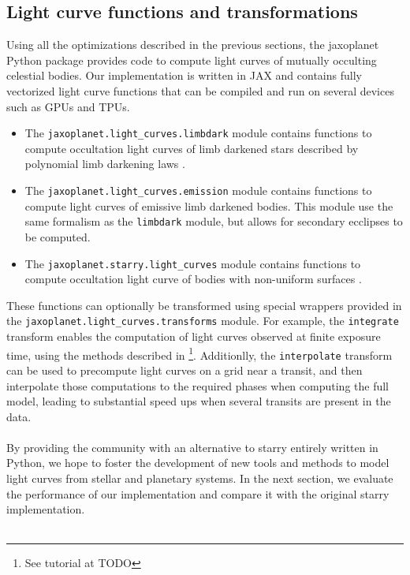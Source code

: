 \documentclass[modern]{aastex631}
\begin{document}
\subsection{Light curve functions and transformations}
Using all the optimizations described in the previous sections, the \textsf{jaxoplanet} Python package provides code to compute light curves of mutually occulting celestial bodies. Our implementation is written in \textsf{JAX} and contains fully vectorized light curve functions that can be compiled and run on several devices such as GPUs and TPUs. 
\begin{itemize}
    \item The \texttt{jaxoplanet.light\_curves.limbdark} module contains functions to compute  occultation light curves of limb darkened stars described by polynomial limb darkening laws \citep{Agol2020}.
    \item The \texttt{jaxoplanet.light\_curves.emission} module contains functions to compute light curves of emissive limb darkened bodies. This module use the same formalism as the \texttt{limbdark} module, but allows for secondary ecclipses to be computed.
    \item The \texttt{jaxoplanet.starry.light\_curves} module contains functions to compute occultation light curve of bodies with non-uniform surfaces \citep{starry}.
\end{itemize}
These functions can optionally be transformed using special wrappers provided in the \texttt{jaxoplanet.light\_curves.transforms}  module. For example, the \texttt{integrate} transform enables the computation of light curves observed at finite exposure time, using the methods described in \cite{Kipping2010}\footnote{See tutorial at TODO}. Additionlly, the \texttt{interpolate} transform can be used to precompute light curves on a grid near a transit, and then interpolate those computations to the required phases when computing the full model, leading to substantial speed ups when several transits are present in the data.\\\\
By providing the community with an alternative to \textsf{starry} entirely written in Python, we hope to foster the development of new tools and methods to model light curves from stellar and planetary systems. In the next section, we evaluate the performance of our implementation and compare it with the original \textsf{starry} implementation.\\\\
\end{document}
